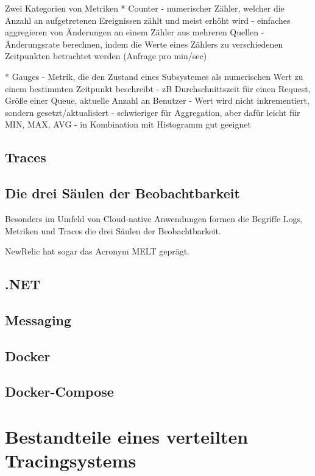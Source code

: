 \documentclass[a4paper,12p]{article}
\begin{document}
Zwei Kategorien von Metriken
* Counter
    - numerischer Zähler, welcher die Anzahl an aufgetretenen Ereignissen zählt und meist erhöht wird
    - einfaches aggregieren von Änderungen an einem Zähler aus mehreren Quellen
    - Änderungsrate berechnen, indem die Werte eines Zählers zu verschiedenen Zeitpunkten betrachtet werden (Anfrage pro min/sec)

* Gauges
    - Metrik, die den Zustand eines Subsystemes als numerischen Wert zu einem bestimmten Zeitpunkt beschreibt
    - zB Durchschnittszeit für einen Request, Größe einer Queue, aktuelle Anzahl an Benutzer
    - Wert wird nicht inkrementiert, sondern gesetzt/aktualisiert
    - schwieriger für Aggregation, aber dafür leicht für MIN, MAX, AVG
    - in Kombination mit Histogramm gut geeignet
    

\subsection{Traces}

\subsection{Die drei Säulen der Beobachtbarkeit}
Besonders im Umfeld von Cloud-native Anwendungen formen die Begriffe Logs, Metriken und Traces die drei Säulen der Beobachtbarkeit.

NewRelic hat sogar das Acronym MELT geprägt.

\subsection{.NET}

\subsection{Messaging}

\subsection{Docker}

\subsection{Docker-Compose}



\section{Bestandteile eines verteilten Tracingsystems}
\end{document}
